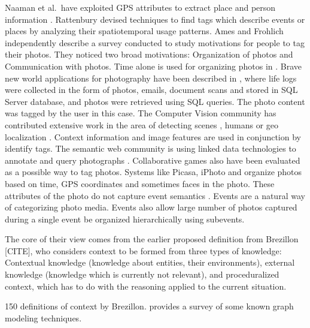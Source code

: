 Naaman et al.\ have exploited GPS attributes to extract place and person information \cite{naaman2005leveraging, naaman2005identity}. Rattenbury \cite{rattenbury2009methods} devised techniques to find tags which describe events or places by analyzing their spatiotemporal usage patterns. Ames and Frohlich \cite{ames2007we, frohlich2002requirements} independently describe a survey conducted to study motivations for people to tag their photos. They noticed two broad motivations: Organization of photos and Communication with photos. Time alone is used for organizing photos in \cite{graham2002time, hailpern2011youpivot}. Brave new world applications for photography have been described in \cite{gemmell2002mylifebits, dumais2003stuff}, where life logs were collected in the form of photos, emails, document scans and stored in SQL Server database, and photos were retrieved using SQL queries. The photo content was tagged by the user in this case. The Computer Vision community has contributed extensive work in the area of detecting scenes \cite{xiao2010sun}, humans \cite{dalal2005histograms} or geo localization \cite{hays2008im2gps}. Context information and image features are used in conjunction by \cite{o2009context, cao2008annotating, boutell2005beyond, cao2008eventscene} identify tags. The semantic web community is using linked data technologies to annotate and query photographs \cite{monaghan2006automating, nowack2006confoto}. Collaborative games also have been evaluated as a possible way to tag photos\cite{diakopoulos2007photoplay}. Systems like Picasa, iPhoto and \cite{graham2002time} organize photos based on time, GPS coordinates and sometimes faces in the photo. These attributes of the photo do not capture event semantics \cite{sawant2011automatic}. Events are a natural way of categorizing photo media. Events also allow large number of photos captured during a single event be organized hierarchically using subevents.

The core of their view comes from the earlier proposed definition from Brezillon [CITE], who considers context to be formed from three types of knowledge: Contextual knowledge (knowledge about entities, their environments), external knowledge (knowledge which is currently not relevant), and proceduralized context, which has to do with the reasoning applied to the current situation.

150 definitions of context by Brezillon.
 \cite{mostefaoui2004context} provides a survey of some known graph modeling techniques.